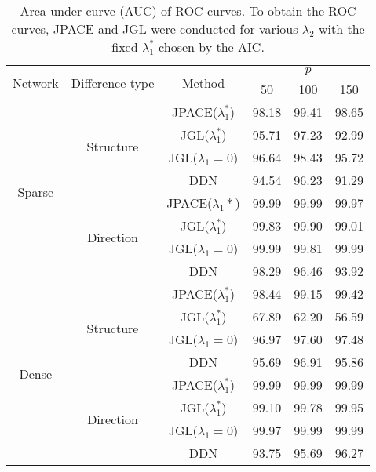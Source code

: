 \documentclass[useAMS,usenatbib,referee]{bio}
\begin{document}
{\begin{table}[htb!]
\caption{Area under curve (AUC) of ROC curves.
To obtain the ROC curves, JPACE and JGL were conducted for various $\lambda_2$ with the fixed $\lambda_1^*$ chosen by the AIC.}
\medskip
\centering
{\footnotesize
\begin{tabular}{|c|c|c|c|c|c|} \cline{1-6}
\multirow{2}{*}{Network}	&	\multirow{2}{*}{Difference type}	&	\multirow{2}{*}{Method}	&	\multicolumn{3}{|c|}{$p$}					\\	\cline{4-6}
	&		&		&	50	&	100	&	150	\\	\hline
\multirow{8}{*}{Sparse}	&	\multirow{4}{*}{Structure}	&	JPACE($\lambda_1^*$)	&	98.18	&	99.41	&	98.65	\\	
	&		&	JGL($\lambda_1^*$)	&	95.71	&	97.23	&	92.99	\\	
	&		&	JGL($\lambda_1=0$)	&	96.64	&	98.43	&	95.72	\\	
	&		&	DDN	&	94.54	&	96.23	&	91.29	\\	\cline{2-6}
	&	\multirow{4}{*}{Direction}	&	JPACE($\lambda_1*$)	&	99.99	&	99.99	&	99.97	\\	
	&		&	JGL($\lambda_1^*$)	&	99.83	&	99.90	&	99.01	\\	
	&		&	JGL($\lambda_1=0$)	&	99.99	&	99.81	&	99.99	\\	
	&		&	DDN	&	98.29	&	96.46	&	93.92	\\	\hline
\multirow{8}{*}{Dense}	&	\multirow{4}{*}{Structure}	&	JPACE($\lambda_1^*$)	&	98.44	&	99.15	&	99.42	\\	
	&		&	JGL($\lambda_1^*$)	&	67.89	&	62.20	&	56.59	\\	
	&		&	JGL($\lambda_1=0$)	&	96.97	&	97.60	&	97.48	\\	
	&		&	DDN	&	95.69	&	96.91	&	95.86	\\	\cline{2-6}
	&	\multirow{4}{*}{Direction}	&	JPACE($\lambda_1^*$)	&	99.99	&	99.99	&	99.99	\\	
	&		&	JGL($\lambda_1^*$)	&	99.10	&	99.78	&	99.95	\\	
	&		&	JGL($\lambda_1=0$)	&	99.97	&	99.99	&	99.99	\\	
	&		&	DDN	&	93.75	&	95.69	&	96.27	\\	\hline

\end{tabular}
}
\end{table}


}
\end{document}
